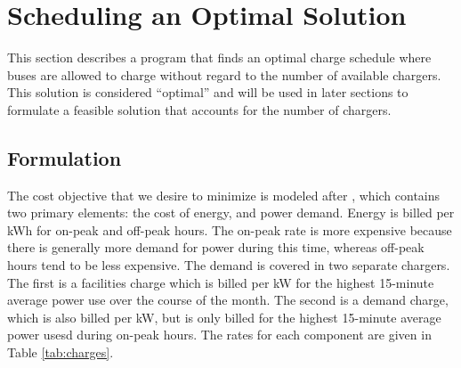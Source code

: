 \section{Scheduling an Optimal Solution\label{sec:optimalSolution}}
This section describes a program that finds an optimal charge schedule where buses are allowed to charge without regard to the number of available chargers. This solution is considered ``optimal'' and will be used in later sections to formulate a feasible solution that accounts for the number of chargers.
 

 
\subsection{Formulation\label{sec:formulation}} 
The cost objective that we desire to minimize is modeled after \cite{rocky_mountain_power_rocky_2021}, which contains two primary elements: the cost of energy, and power demand. Energy is billed per kWh for on-peak and off-peak hours. The on-peak rate is more expensive because there is generally more demand for power during this time, whereas off-peak hours tend to be less expensive. The demand is covered in two separate chargers.  The first is a facilities charge which is billed per kW for the highest 15-minute average power use over the course of the month. The second is a demand charge, which is also billed per kW, but is only billed for the highest 15-minute average power usesd during on-peak hours. The rates for each component are given in Table \ref{tab:charges}.  

